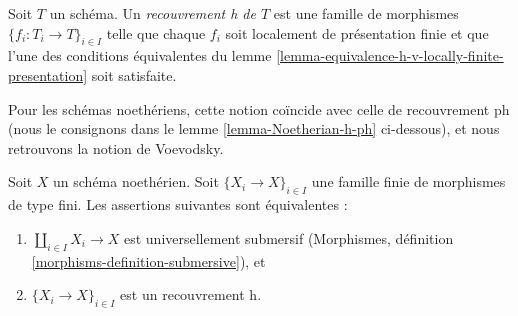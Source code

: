 \begin{definition}
\label{definition-h-covering}
Soit $T$ un schéma. Un {\it recouvrement h de $T$} est une famille de morphismes
$\{f_i : T_i \to T\}_{i \in I}$ telle que chaque $f_i$ soit
localement de présentation finie et que l'une des conditions équivalentes du
lemme \ref{lemma-equivalence-h-v-locally-finite-presentation} soit satisfaite.
\end{definition}

\noindent
Pour les schémas noethériens, cette notion coïncide avec celle de recouvrement ph
(nous le consignons dans le lemme \ref{lemma-Noetherian-h-ph} ci-dessous), et
nous retrouvons la notion de Voevodsky.

\begin{lemma}
\label{lemma-Noetherian-h-covering}
Soit $X$ un schéma noethérien. Soit $\{X_i \to X\}_{i \in I}$
une famille finie de morphismes de type fini. Les assertions suivantes sont équivalentes :
\begin{enumerate}
\item $\coprod_{i \in I} X_i \to X$ est universellement submersif
(Morphismes, définition
\ref{morphisms-definition-submersive}), et
\item $\{X_i \to X\}_{i \in I}$ est un recouvrement h.
\end{enumerate}
\end{lemma}

